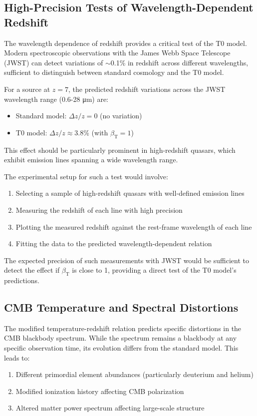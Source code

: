 \documentclass[12pt,a4paper]{article} %
\newcommand{\betaT}{\beta_{\text{T}}}
\begin{document}
	\subsection{High-Precision Tests of Wavelength-Dependent Redshift}
	\label{subsec:redshift_tests}
	
	The wavelength dependence of redshift
	provides a critical test of the T0 model. 
	Modern spectroscopic observations with the James Webb Space Telescope (JWST)
	can detect variations of $\sim$0.1\% in redshift across different wavelengths,
	sufficient to distinguish between standard cosmology and the T0 model.
	
	For a source at $z = 7$,
	the predicted redshift variations across the JWST wavelength range
	(0.6-28 \si{\micro\meter}) are:
	\begin{itemize}
		\item Standard model: $\Delta z/z = 0$ (no variation)
		\item T0 model: $\Delta z/z \approx 3.8\%$ (with $\betaT = 1$)
	\end{itemize}
	
	This effect should be particularly prominent in high-redshift quasars,
	which exhibit emission lines spanning a wide wavelength range.
	
	The experimental setup for such a test would involve:
	\begin{enumerate}
		\item Selecting a sample of high-redshift quasars
		with well-defined emission lines
		\item Measuring the redshift of each line
		with high precision
		\item Plotting the measured redshift
		against the rest-frame wavelength of each line
		\item Fitting the data to the predicted
		wavelength-dependent relation
	\end{enumerate}
	
	The expected precision of such measurements with JWST
	would be sufficient to detect the effect if $\betaT$ is close to 1,
	providing a direct test of the T0 model's predictions.
	
	\subsection{CMB Temperature and Spectral Distortions}
	\label{subsec:cmb_distortions}
	
	The modified temperature-redshift relation
	predicts specific distortions in the CMB blackbody spectrum. 
	While the spectrum remains a blackbody at any specific observation time,
	its evolution differs from the standard model. 
	This leads to:
	\begin{enumerate}
		\item Different primordial element abundances
		(particularly deuterium and helium)
		\item Modified ionization history
		affecting CMB polarization
		\item Altered matter power spectrum
		affecting large-scale structure
	\end{enumerate}
	
\end{document}
